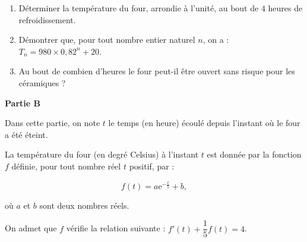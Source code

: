 \documentclass[10pt,a4paper]{article}
\begin{document}
\medskip

\begin{enumerate}
\item Déterminer la température du four, arrondie à l'unité, au bout de $4$ heures de
refroidissement.
\item Démontrer que, pour tout nombre entier naturel $n$, on a : $T_n = 980 \times 0,82^n + 20$.
\item Au bout de combien d'heures le four peut-il être ouvert sans risque pour les céramiques ?
 \end{enumerate}
 
\bigskip

\textbf{Partie B}

\medskip

Dans cette partie, on note $t$ le temps (en heure) écoulé depuis l'instant où le four a été éteint.

La température du four (en degré Celsius) à l'instant $t$ est donnée par la fonction $f$ définie,
pour tout nombre réel $t$ positif, par : 

\[f(t) = a\text{e}^{- \frac{t}{5}} + b,\]

où $a$ et $b$ sont deux nombres réels.

On admet que $f$ vérifie la relation suivante : $f'(t) + \dfrac{1}{5}f(t) = 4$.
\medskip
\end{document}
